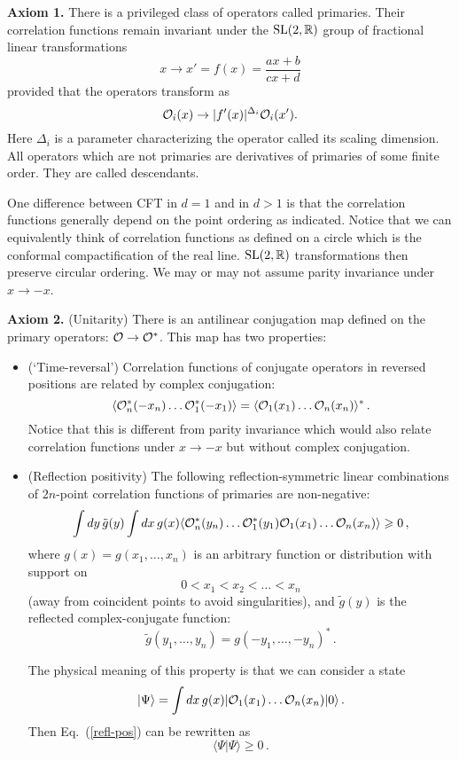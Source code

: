 \documentclass[12pt]{article}
\newcommand{\reef}[1]{(\ref{#1})}
\newcommand{\beq}{\begin{equation}}
\newcommand{\eeq}{\end{equation}}
\def\bR {\mathbb{R}}
\def\calO {{\cal O}}
\def\ge{\geqslant}
\numberwithin{equation}{section}
\begin{document}
{\bf Axiom 1.} There is a privileged class of operators called primaries. Their correlation functions remain invariant under the ${\rm SL}(2,\bR)$ group of fractional linear transformations
\beq
x\to x'=f(x) = \frac{ax+b}{cx+d}
\eeq
provided that the operators transform as
\beq
\calO_i(x)\to |f'(x)|^{\Delta_i}\calO_i(x').
\eeq
Here $\Delta_i$ is a parameter characterizing the operator called its scaling dimension. All operators which are not primaries are derivatives of primaries of some finite order. They are called descendants.

One difference between CFT in $d=1$ and in $d>1$ is that the correlation functions generally depend on the point ordering as indicated. Notice that we can equivalently think of correlation functions as defined on a circle which is the conformal compactification of the real line. ${\rm SL}(2,\bR)$ transformations then preserve circular ordering. 
We may or may not assume parity invariance under $x\to -x$.
 
{\bf Axiom 2.} (Unitarity) There is an antilinear conjugation map defined on the primary operators: $\calO\to\calO^*$. This map has two properties: 
\begin{itemize}
\item (`Time-reversal') Correlation functions of conjugate operators in reversed positions are related by complex conjugation:
\beq
\langle \calO_n^*(-x_n)\ldots\calO_1^*(-x_1)\rangle = \langle \calO_1(x_1)\ldots\calO_n(x_n)\rangle ^*\,.
\eeq
Notice that this is different from parity invariance which would also relate correlation functions under $x\to-x$ but without complex conjugation.  

\item (Reflection positivity) The following reflection-symmetric linear combinations of $2n$-point correlation functions of primaries are non-negative:
\beq
\label{refl-pos}
\int d y\,\tilde g( y) \int d x\, g( x) \langle \calO_n^*(y_n)\ldots\calO_1^*(y_1) \calO_1(x_1)\ldots\calO_n(x_n)\rangle \ge 0\,,
\eeq
where $g(x)=g(x_1,\ldots,x_n)$ is an arbitrary function or distribution with support on 
\beq
0<x_1<x_2<\ldots<x_n
\eeq (away from coincident points to avoid singularities), and $\tilde g(y)$ is the reflected complex-conjugate function:
\beq
\tilde g(y_1,\ldots,y_n) = g(-y_1,\ldots,-y_n)^*\,.
\eeq

The physical meaning of this property is that we can consider a state
\beq
|\Psi\rangle = \int dx\, g(x) |\calO_1(x_1)\ldots\calO_n(x_n)|0\rangle\,.
\eeq
Then Eq.~\reef{refl-pos} can be rewritten as
\beq
 \langle\Psi|\Psi\rangle \ge 0\,.
 \eeq
 \end{itemize}
 
\end{document}
